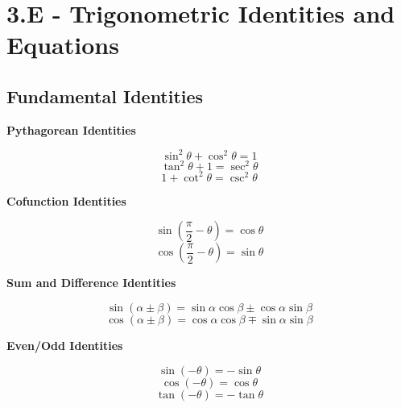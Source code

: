 \documentclass{exam}
\begin{document}

\section*{3.E - Trigonometric Identities and Equations}\label{sec:trig-identities}
\subsection*{Fundamental Identities}

\begin{tcolorbox}[title=Recall: \textit{Fundamental Trigonometric Identities},title filled,colframe=black,sharpish corners,width=\linewidth]
    \begin{minipage}[t]{.45\linewidth}

        \begin{center}
            \textbf{Pythagorean Identities}
        \end{center}
        \[\sin^2\theta+\cos^2\theta=1\]
        \[\tan^2\theta+1=\sec^2\theta\]
        \[1+\cot^2\theta=\csc^2\theta\]
    \end{minipage}
    \hfil
    \begin{minipage}[t]{.45\linewidth}
        \begin{center}
            \textbf{Cofunction Identities}
        \end{center}
        \[\sin\left(\frac{\pi}{2}-\theta\right)=\cos\theta\]
        \[\cos\left(\frac{\pi}{2}-\theta\right)=\sin\theta\]
    \end{minipage}

    \vspace{.2in}

    \begin{minipage}[t]{.45\linewidth}
        \begin{center}
            \textbf{Sum and Difference Identities}
        \end{center}
        \[\sin(\alpha\pm\beta)=\sin\alpha\cos\beta\pm\cos\alpha\sin\beta\]
        \[\cos(\alpha\pm\beta)=\cos\alpha\cos\beta\mp\sin\alpha\sin\beta\]
    \end{minipage}
    \hfil
    \begin{minipage}[t]{.45\linewidth}
        \begin{center}
            \textbf{Even/Odd Identities}
        \end{center}
        \[\sin(-\theta)=-\sin\theta\]
        \[\cos(-\theta)=\cos\theta\]
        \[\tan(-\theta)=-\tan\theta\]
    \end{minipage}


\end{tcolorbox}
\end{document}

